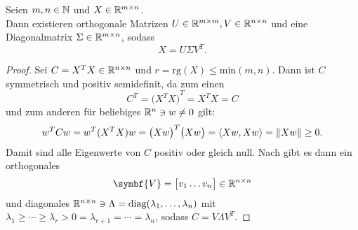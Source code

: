 \begin{theorem}[Singulärwertzerlegung]\label{th:svd}
    Seien \(m,n\in\mathbb{N}\) und \(X \in \mathbb{R}^{m \times n}\). \\
    Dann existieren orthogonale Matrizen \(U \in \mathbb{R}^{m \times m}, V \in \mathbb{R}^{n \times n}\) und eine Diagonalmatrix \(\Sigma \in \mathbb{R}^{m \times n}\), sodass
    \begin{equation*}
        X = U \Sigma V^{T}.
    \end{equation*}
\end{theorem}
\begin{proof}
    Sei \(C = X^{T}X \in \mathbb{R}^{n \times n}\) und \(r = \text{rg}(X) \leq \text{min}(m,n)\).
    Dann ist \(C\) symmetrisch und positiv semidefinit, da zum einen 
    \begin{equation*}
        C^{T} = {\big(X^{T}X\big)}^{T} = X^{T}X = C
    \end{equation*}  
    und zum anderen für beliebiges \(\mathbb{R}^{n} \ni w \neq 0\) gilt:
    \begin{equation*}
        w^{T}Cw = w^{T}(X^{T}X)w = {\big(Xw\big)}^{T}\big(Xw\big) = \langle Xw,Xw \rangle = \lVert Xw\rVert \geq 0.
    \end{equation*}
    Damit sind alle Eigenwerte von \(C\) positiv oder gleich null. 
    Nach  gibt es dann ein orthogonales 
    \begin{equation*}
        \symbf{V} =
        \big[
        \begin{matrix}
            v_1 \dots v_n
        \end{matrix}
        \big]
        \in \R^{n \times n}
    \end{equation*}
    und diagonales \(\mathbb{R}^{n \times n} \ni \Lambda = \operatorname{diag}(\lambda_1,\ldots,\lambda_n)\) mit \(\lambda_1 \geq \cdots \geq \lambda_r > 0 = \lambda_{r+1} = \cdots = \lambda_n\), sodass \(C = V \Lambda V^{T}\).    


\end{proof}
